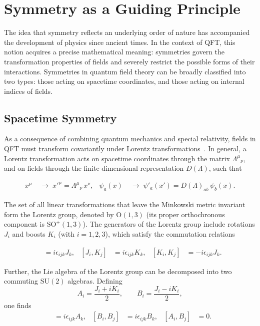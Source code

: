 \section{Symmetry as a Guiding Principle}
\label{sec:symmetry}

The idea that symmetry reflects an underlying order of nature has accompanied the development of physics since ancient times.
In the context of QFT, this notion acquires a precise mathematical meaning: symmetries govern the transformation properties of fields and severely restrict the possible forms of their interactions.
Symmetries in quantum field theory can be broadly classified into two types: those acting on spacetime coordinates, and those acting on internal indices of fields.

\subsection{Spacetime Symmetry}\label{subsec:spacetime}

As a consequence of combining quantum mechanics and special relativity, fields in QFT must transform covariantly under Lorentz transformations~\cite{PeskinSchroeder,WeinbergQFT}.
In general, a Lorentz transformation acts on spacetime coordinates through the matrix $\Lambda^{\mu}{}_{\nu}$, and on fields through the finite-dimensional representation $D(\Lambda)$, such that

\begin{align}
    x^\mu &\;\rightarrow\; x'^{\mu} = \Lambda^{\mu}{}_{\nu}\, x^{\nu}, &
    \psi_a(x) &\;\rightarrow\; \psi'_a(x') = D(\Lambda)_{ab}\, \psi_b(x).
\end{align}

The set of all linear transformations that leave the Minkowski metric invariant form the Lorentz group, denoted by $\mathrm{O}(1,3)$ (its proper orthochronous component is $\mathrm{SO}^+(1,3)$).
The generators of the Lorentz group include rotations $J_i$ and boosts $K_i$ (with $i=1,2,3$), which satisfy the commutation relations

\begin{align}
    [J_i,J_j] &= i\epsilon_{ijk}J_k, & 
    [J_i,K_j] &= i\epsilon_{ijk}K_k, &
    [K_i,K_j] &= -i\epsilon_{ijk}J_k.
\label{eq:JK-algebra}
\end{align}

Further, the Lie algebra of the Lorentz group can be decomposed into two commuting $\mathrm{SU}(2)$ algebras. Defining
\[
    A_i=\frac{J_i+iK_i}{2},\qquad B_i=\frac{J_i-iK_i}{2},
\]
one finds
\begin{align}
    [A_i,A_j] &= i\epsilon_{ijk}A_k, &
    [B_i,B_j] &= i\epsilon_{ijk}B_k, &
    [A_i,B_j] &= 0.
\label{eq:AB-algebra}
\end{align}

